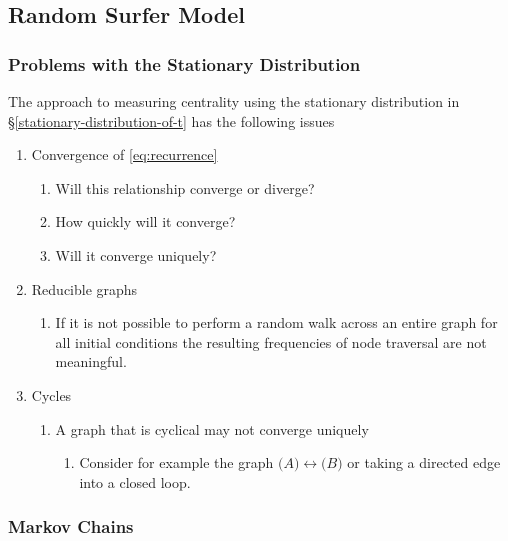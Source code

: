 \documentclass[11pt]{report}
\begin{document}
\subsection{Random Surfer Model}
\label{sec:org046df67}
\subsubsection{Problems with the Stationary Distribution}
\label{issues}
The approach to measuring centrality using the stationary distribution in \S\ref{stationary-distribution-of-t} has the following issues

\begin{enumerate}
\item Convergence of \eqref{eq:recurrence}
\begin{enumerate}
\item Will this relationship converge or diverge?
\item How quickly will it converge?
\item Will it converge uniquely?
\end{enumerate}
\item Reducible graphs
\begin{enumerate}
\item If it is not possible to perform a random walk across an entire graph for
all initial conditions the resulting frequencies of node traversal are not
meaningful.
\end{enumerate}
\item Cycles
\begin{enumerate}
\item A graph that is cyclical may not converge uniquely
\begin{enumerate}
\item Consider for example the graph \({\big (} A {\big )} \longleftrightarrow {\big (} B {\big )}\) or taking a directed edge into a closed loop.
\end{enumerate}
\end{enumerate}
\end{enumerate}

\subsubsection{Markov Chains}
\label{markov}
\end{document}
